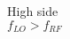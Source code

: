 \documentclass[preview]{standalone}
\begin{document}
\begin{center}
High side\\$f_{LO} > f_{RF}$
\end{center}
\end{document}
